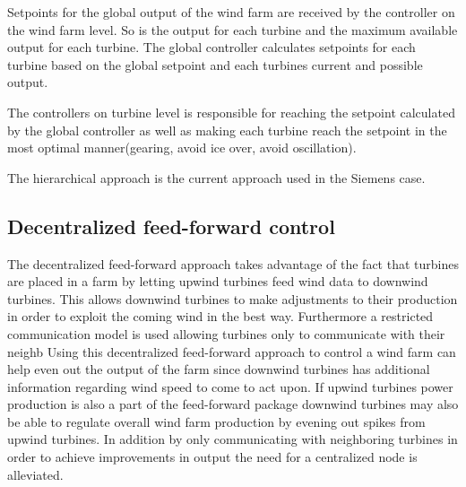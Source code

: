 Setpoints for the global output of the wind farm are received by the controller on the wind farm level.
So is the output for each turbine and the maximum available output for each turbine.
The global controller calculates setpoints for each turbine based on the global setpoint and each turbines current and possible output.

The controllers on turbine level is responsible for reaching the setpoint calculated by the global controller as well as making each turbine reach the setpoint in the most optimal manner(gearing, avoid ice over, avoid oscillation).

The hierarchical approach is the current approach used in the Siemens case.

\subsection{Decentralized feed-forward control}
The decentralized feed-forward approach\cite{DecentralisedFeedforwardControlOfWindFarms} takes advantage of the fact that turbines are placed in a farm by letting upwind turbines feed wind data to downwind turbines. 
This allows downwind turbines to make adjustments to their production in order to exploit the coming wind in the best way.
Furthermore a restricted communication model is used allowing turbines only to communicate with their neighb
Using this decentralized feed-forward approach to control a wind farm can help even out the output of the farm since downwind turbines has additional information regarding wind speed to come to act upon. If upwind turbines power production is also a part of the feed-forward package downwind turbines may also be able to regulate overall wind farm production by evening out spikes from upwind turbines.
In addition by only communicating with neighboring turbines in order to achieve improvements in output the need for a centralized node is alleviated.

